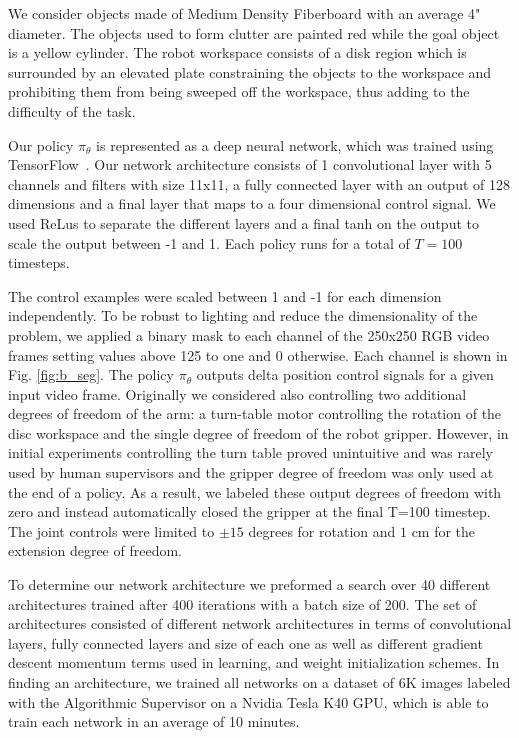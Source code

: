 \documentclass[10pt, conference]{ieeeconf}      %
\begin{document}
We consider objects made of Medium Density Fiberboard with an average 4" diameter. The objects used to form clutter are
painted red while the goal object is a yellow cylinder. The robot workspace consists of a disk region which is
surrounded by an elevated plate constraining the objects to the workspace and prohibiting them from being sweeped off
the workspace, thus adding to the difficulty of the task.

Our policy $\pi_{\theta}$ is represented as a deep neural network, which was trained using
TensorFlow~\cite{tensorflow2015-whitepaper}. Our network architecture consists of 1 convolutional layer with 5 channels
and filters with size 11x11, a fully connected layer with an output of 128 dimensions and a final layer that maps to a
four dimensional control signal. We used ReLus to separate the different layers and a final tanh on the output to scale
the output between -1 and 1. Each policy runs for a total of $T=100$ timesteps.

The control examples were scaled between 1 and -1 for each dimension independently. To be robust to lighting and reduce
the dimensionality of the problem, we applied a binary mask to each channel of the 250x250 RGB video frames setting
values above 125 to one and 0 otherwise. Each channel is shown in Fig. \ref{fig:b_seg}.
The policy $\pi_\theta$ outputs delta position control signals for a given input video frame.
Originally we considered also controlling two additional degrees of freedom of the arm: a turn-table motor controlling
the rotation of the disc workspace and the single degree of freedom of the robot gripper. However, in initial
experiments controlling the turn table proved unintuitive and was rarely used by human supervisors and the gripper degree of freedom was only used at the end of a policy. As a result, we labeled these output degrees of freedom with zero and instead automatically closed the gripper
at the final T=100 timestep. The joint controls were limited to $\pm 15$ degrees for rotation and $1$ cm for the
extension degree of freedom.

To determine our network architecture we preformed a search over 40 different architectures trained after 400 iterations
with a batch size of 200. The set of architectures consisted of different network architectures in terms of
convolutional layers, fully connected layers and size of each one as well as different gradient descent momentum
terms used in learning, and weight initialization schemes. In finding an architecture, we trained all networks on a dataset of 6K images labeled with the Algorithmic Supervisor on a Nvidia Tesla K40 GPU, which is able to train each network in an average of 10 minutes.  
\end{document}
